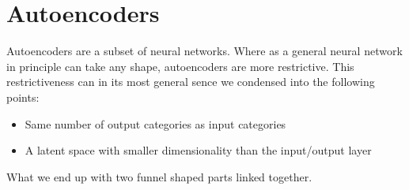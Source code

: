 \chapter*{Autoencoders}
Autoencoders are a subset of neural networks. Where as a general neural network in principle can take any shape, autoencoders are more restrictive.
This restrictiveness can in its most general sence we condensed into the following points:
\begin{itemize}
    \item Same number of output categories as input categories  
    \item A latent space with smaller dimensionality than the input/output layer  
\end{itemize}
What we end up with two funnel shaped parts linked together. 